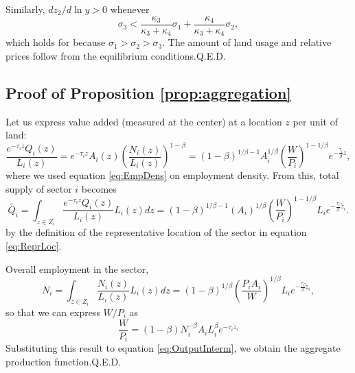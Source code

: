 \documentclass[12pt]{article}
\begin{document}
Similarly, $dz_2/d\ln y>0$ whenever 
\[
\sigma_3 < \frac{\kappa_3}{\kappa_3+\kappa_4}\sigma_1 + \frac{\kappa_4}{\kappa_3+\kappa_4}\sigma_2, 
\]
which holds for because $\sigma_1>\sigma_2>\sigma_3$. The amount of land usage and relative prices follow from the equilibrium conditions.\hfill Q.E.D.
\subsection{Proof of Proposition \ref{prop:aggregation}}
Let us express value added (measured at the center) at a location $z$ per unit of land:
\[
\frac{e^{-\tau_i z} Q_i(z)}{L_i(z)} = e^{-\tau_i z} A_i(z)\left(\frac{N_i(z)}{L_i(z)}\right)^{1-\beta} = (1-\beta)^{1/\beta-1}
A_i^{1/\beta}\left(\frac{W}{P_i}\right)^{1-1/\beta}
 e^{-\frac{\tau_i}{\beta} z},
\]
where we used equation \ref{eq:EmpDens} on employment density. From this, total supply of sector $i$ becomes
\begin{equation}
\label{eq:OutputInterm}
\tilde{Q_i} = \int_{z\in Z_i}\frac{e^{-\tau_i z} Q_i(z)}{L_i(z)}L_i(z)dz=(1-\beta)^{1/\beta-1}
(A_i)^{1/\beta}\left(\frac{W}{P_i}\right)^{1-1/\beta} L_i e^{-\frac{\tau_i}{\beta} \tilde z_i}.
\end{equation}
by the definition of the representative location of the sector in equation \ref{eq:ReprLoc}.

Overall employment in the sector,
\[
N_i = \int_{z\in Z_i}\frac{N_i(z)}{L_i(z)}L_i(z)dz= (1-\beta)^{1/\beta}
\left(\frac{P_iA_i}{W}\right)^{1/\beta} L_i e^{-\frac{\tau_i}{\beta} \tilde z_i},
\]
so that we can express $W/P_i$ as
\[
\frac{W}{P_i} = (1-\beta)
N_i^{-\beta}A_i L_i^{\beta}
 e^{-\tau_i\tilde z_i}
\]
Substituting this result to equation \eqref{eq:OutputInterm}, we obtain the aggregate production function.\hfill Q.E.D.


\end{document}
